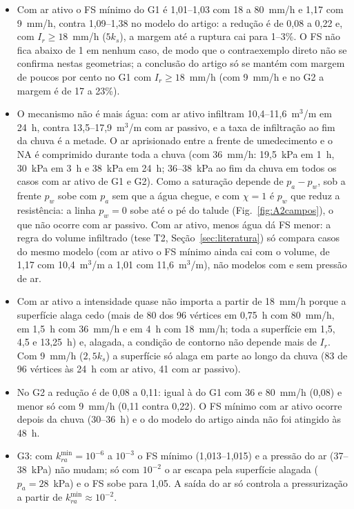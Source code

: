\begin{itemize}
\item Com ar ativo o FS m\'inimo do G1 \'e 1,01--1,03 com 18 a 80~mm/h e 1,17 com 9~mm/h, contra 1,09--1,38 no modelo
do artigo: a redu\c{c}\~ao \'e de 0,08 a 0,22 e, com $I_r\ge18$~mm/h ($5k_s$), a margem at\'e a ruptura cai para 1--3\%.
O FS n\~ao fica abaixo de 1 em nenhum caso, de modo que o contraexemplo direto n\~ao se confirma nestas geometrias; a
conclus\~ao do artigo s\'o se mant\'em com margem de poucos por cento no G1 com $I_r\ge18$~mm/h (com 9~mm/h e no G2 a
margem \'e de 17 a 23\%).
\item O mecanismo n\~ao \'e mais \'agua: com ar ativo infiltram 10,4--11,6~m$^3$/m em 24~h, contra 13,5--17,9~m$^3$/m
com ar passivo, e a taxa de infiltra\c{c}\~ao ao fim da chuva \'e a metade. O ar aprisionado entre a frente de
umedecimento e o NA \'e comprimido durante toda a chuva (com 36~mm/h: 19,5~kPa em 1~h, 30~kPa em 3~h e 38~kPa em
24~h; 36--38~kPa ao fim da chuva em todos os casos com ar ativo de G1 e G2). Como a satura\c{c}\~ao depende de
$p_a-p_w$, sob a frente
$p_w$ sobe com $p_a$ sem que a \'agua chegue, e com $\chi=1$ \'e $p_w$ que reduz a resist\^encia: a linha $p_w=0$ sobe
at\'e o p\'e do talude (Fig.~\ref{fig:A2campos}), o que n\~ao ocorre com ar passivo. Com ar ativo, menos \'agua d\'a FS
menor: a regra do volume infiltrado (tese T2, Se\c{c}\~ao~\ref{sec:literatura}) s\'o compara casos do mesmo modelo
(com ar ativo o FS m\'inimo ainda cai com o volume, de 1,17 com 10,4~m$^3$/m a 1,01 com 11,6~m$^3$/m), n\~ao modelos
com e sem press\~ao de ar.
\item Com ar ativo a intensidade quase n\~ao importa a partir de 18~mm/h porque a superf\'icie alaga cedo (mais de 80
dos 96 v\'ertices em 0,75~h com 80~mm/h, em 1,5~h com 36~mm/h e em 4~h com 18~mm/h; toda a superf\'icie em 1,5, 4,5 e
13,25~h) e, alagada, a condi\c{c}\~ao de contorno n\~ao depende mais de $I_r$. Com 9~mm/h ($2{,}5k_s$) a superf\'icie
s\'o alaga em parte ao longo da chuva (83 de 96 v\'ertices \`as 24~h com ar ativo, 41 com ar passivo).
\item No G2 a redu\c{c}\~ao \'e de 0,08 a 0,11: igual \`a do G1 com 36 e 80~mm/h (0,08) e menor s\'o com 9~mm/h (0,11
contra 0,22). O FS m\'inimo com ar ativo ocorre depois da chuva (30--36~h) e o do modelo do artigo ainda n\~ao foi
atingido \`as 48~h.
\item G3: com $k_{ra}^{\min}=10^{-6}$ a $10^{-3}$ o FS m\'inimo (1,013--1,015) e a press\~ao do ar (37--38~kPa) n\~ao
mudam; s\'o com $10^{-2}$ o ar escapa pela superf\'icie alagada ($p_a=28$~kPa) e o FS sobe para 1,05. A sa\'ida do ar
s\'o controla a pressuriza\c{c}\~ao a partir de $k_{ra}^{\min}\approx10^{-2}$.
\end{itemize}

